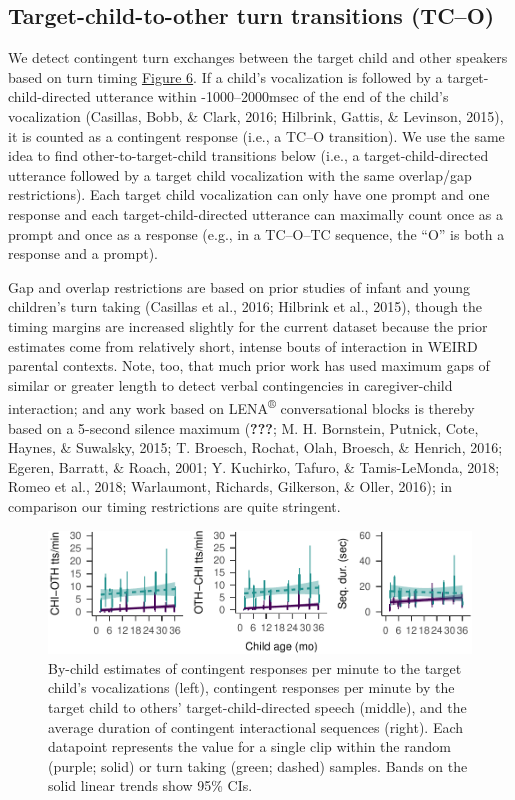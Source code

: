 \documentclass[floatsintext,man]{apa6}
\theoremstyle{definition}
\theoremstyle{definition}
\theoremstyle{definition}
\theoremstyle{remark}
\begin{document}
\subsection{Target-child-to-other turn transitions
(TC--O)}\label{target-child-to-other-turn-transitions-tco}

We detect contingent turn exchanges between the target child and other
speakers based on turn timing \protect\hyperlink{fig6}{Figure 6}. If a
child's vocalization is followed by a target-child-directed utterance
within -1000--2000msec of the end of the child's vocalization (Casillas,
Bobb, \& Clark, 2016; Hilbrink, Gattis, \& Levinson, 2015), it is
counted as a contingent response (i.e., a TC--O transition). We use the
same idea to find other-to-target-child transitions below (i.e., a
target-child-directed utterance followed by a target child vocalization
with the same overlap/gap restrictions). Each target child vocalization
can only have one prompt and one response and each target-child-directed
utterance can maximally count once as a prompt and once as a response
(e.g., in a TC--O--TC sequence, the \enquote{O} is both a response and a
prompt).

Gap and overlap restrictions are based on prior studies of infant and
young children's turn taking (Casillas et al., 2016; Hilbrink et al.,
2015), though the timing margins are increased slightly for the current
dataset because the prior estimates come from relatively short, intense
bouts of interaction in WEIRD parental contexts. Note, too, that much
prior work has used maximum gaps of similar or greater length to detect
verbal contingencies in caregiver-child interaction; and any work based
on LENA\textsuperscript{®} conversational blocks is thereby based on a
5-second silence maximum ({\textbf{???}}; M. H. Bornstein, Putnick,
Cote, Haynes, \& Suwalsky, 2015; T. Broesch, Rochat, Olah, Broesch, \&
Henrich, 2016; Egeren, Barratt, \& Roach, 2001; Y. Kuchirko, Tafuro, \&
Tamis-LeMonda, 2018; Romeo et al., 2018; Warlaumont, Richards,
Gilkerson, \& Oller, 2016); in comparison our timing restrictions are
quite stringent.

\begin{figure}
\centering
\includegraphics{Tseltal-CLE_files/figure-latex/fig7-1.pdf}
\caption{\label{fig:fig7}By-child estimates of contingent responses per
minute to the target child's vocalizations (left), contingent responses
per minute by the target child to others' target-child-directed speech
(middle), and the average duration of contingent interactional sequences
(right). Each datapoint represents the value for a single clip within
the random (purple; solid) or turn taking (green; dashed) samples. Bands
on the solid linear trends show 95\% CIs.}
\end{figure}
\end{document}
